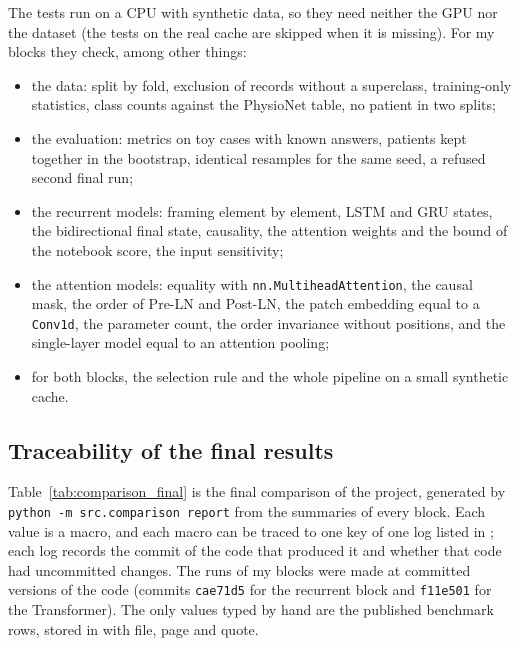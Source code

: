 The tests run on a CPU with synthetic data, so they need neither the GPU nor the dataset (the tests on the
real cache are skipped when it is missing). For my blocks they check, among other things:
\begin{itemize}[leftmargin=1.2em,itemsep=1pt]
  \item the data: split by fold, exclusion of records without a superclass, training-only statistics,
        class counts against the PhysioNet table, no patient in two splits;
  \item the evaluation: metrics on toy cases with known answers, patients kept together in the bootstrap,
        identical resamples for the same seed, a refused second final run;
  \item the recurrent models: framing element by element, LSTM and GRU states, the bidirectional final
        state, causality, the attention weights and the bound of the notebook score, the input sensitivity;
  \item the attention models: equality with \texttt{nn.MultiheadAttention}, the causal mask, the order of
        Pre-LN and Post-LN, the patch embedding equal to a \texttt{Conv1d}, the parameter count, the order
        invariance without positions, and the single-layer model equal to an attention pooling;
  \item for both blocks, the selection rule and the whole pipeline on a small synthetic cache.
\end{itemize}

\subsection{Traceability of the final results}

Table~\ref{tab:comparison_final} is the final comparison of the project, generated by
\texttt{python -m src.comparison report} from the summaries of every block. Each value is a macro, and each
macro can be traced to one key of one log listed in ; each log records the commit of
the code that produced it and whether that code had uncommitted changes. The runs of my blocks were made
at committed versions of the code (commits \texttt{cae71d5} for the recurrent block and \texttt{f11e501} for
the Transformer). The only values typed by hand are the published benchmark rows, stored in
 with file, page and quote.


